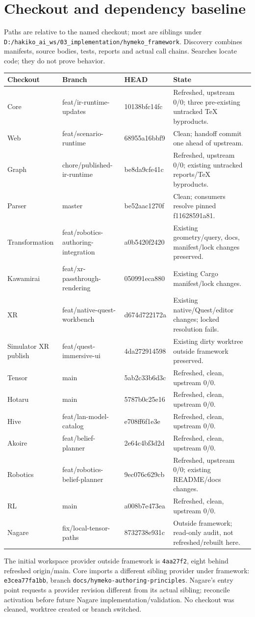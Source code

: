\documentclass[10pt,a4paper]{article}
\newcommand{\code}[1]{{\small\nolinkurl{#1}}}
\begin{document}
\section{Checkout and dependency baseline}
\label{sec:baseline}
Paths are relative to the named checkout; most are siblings under \code{D:/hakiko_ai_ws/03_implementation/hymeko_framework}. Discovery combines manifests, source bodies, tests, reports and actual call chains. Searches locate code; they do not prove behavior.
\begin{longtable}{L{25mm}L{57mm}L{21mm}L{63mm}}
\toprule Checkout & Branch & HEAD & State\\\midrule
Core & feat/ir-runtime-updates & 10138bfc14fc & Refreshed, upstream 0/0; three pre-existing untracked TeX byproducts.\\
Web & feat/scenario-runtime & 68955a16bbf9 & Clean; handoff commit one ahead of upstream.\\
Graph & chore/published-ir-runtime & be8da9cfe41c & Refreshed, upstream 0/0; existing untracked reports/TeX byproducts.\\
Parser & master & be52aac1270f & Clean; consumers resolve pinned f11628591a81.\\
Transformation & feat/robotics-authoring-integration & a0b5420f2420 & Existing geometry/query, docs, manifest/lock changes preserved.\\
Kawamirai & feat/xr-passthrough-rendering & 050991eca880 & Existing Cargo manifest/lock changes.\\
XR & feat/native-quest-workbench & d674d722172a & Existing native/Quest/editor changes; locked resolution fails.\\
Simulator XR publish & feat/quest-immersive-ui & 4da272914598 & Existing dirty worktree outside framework preserved.\\
Tensor & main & 5ab2c33b6d3c & Refreshed, clean, upstream 0/0.\\
Hotaru & main & 5787b0c25e16 & Refreshed, clean, upstream 0/0.\\
Hive & feat/lan-model-catalog & e708ff6f1e3e & Refreshed, clean, upstream 0/0.\\
Akoire & feat/belief-planner & 2e64c4bf3d2d & Refreshed, clean, upstream 0/0.\\
Robotics & feat/robotics-belief-planner & 9ec076c629cb & Refreshed, upstream 0/0; existing README/docs changes.\\
RL & main & a008b7e473ea & Refreshed, clean, upstream 0/0.\\
Nagare & fix/local-tensor-paths & 8732738e931c & Outside framework; read-only audit, not refreshed/rebuilt here.\\
\bottomrule
\end{longtable}
The initial workspace provider outside framework is \code{4aa27f2}, eight behind refreshed origin/main. Core imports a different sibling provider under framework: \code{e3cea77fa1bb}, branch \code{docs/hymeko-authoring-principles}. Nagare's entry point requests a provider revision different from its actual sibling; reconcile activation before future Nagare implementation/validation. No checkout was cleaned, worktree created or branch switched.
\end{document}
